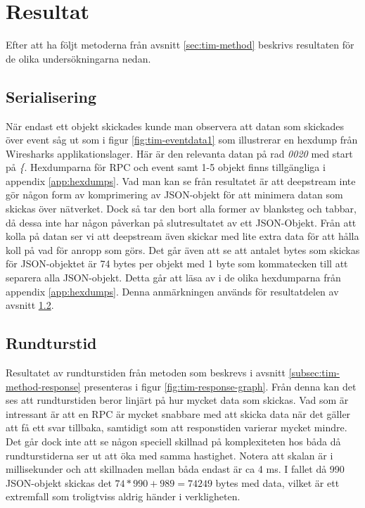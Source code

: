 \section{Resultat}
\label{sec:tim-results}
Efter att ha följt metoderna från avsnitt \ref{sec:tim-method} beskrivs resultaten för de olika undersökningarna nedan. 

\subsection{Serialisering}
När endast ett objekt skickades kunde man observera att datan som skickades över event såg ut som i figur \ref{fig:tim-eventdata1} som illustrerar en hexdump från Wiresharks applikationslager. Här är den relevanta datan på rad \textit{0020} med start på \textit{\{}. Hexdumparna för RPC och event samt 1-5 objekt finns tillgängliga i appendix \ref{app:hexdumps}. Vad man kan se från resultatet är att deepstream inte gör någon form av komprimering av JSON-objekt för att minimera datan som skickas över nätverket. Dock så tar den bort alla former av blanksteg och tabbar, då dessa inte har någon påverkan på slutresultatet av ett JSON-Objekt. Från att kolla på datan ser vi att deepstream även skickar med lite extra data för att hålla koll på vad för anropp som görs. Det går även att se att antalet bytes som skickas för JSON-objektet är 74 bytes per objekt med 1 byte som kommatecken till att separera alla JSON-objekt. Detta går att läsa av i de olika hexdumparna från appendix \ref{app:hexdumps}. Denna anmärkningen används för resultatdelen av avsnitt \ref{subsec:tim-result-response}.

\subsection{Rundturstid}
\label{subsec:tim-result-response}
Resultatet av rundturstiden från metoden som beskrevs i avsnitt \ref{subsec:tim-method-response} presenteras i figur \ref{fig:tim-response-graph}. Från denna kan det ses att rundturstiden beror linjärt på hur mycket data som skickas. Vad som är intressant är att en RPC är mycket snabbare med att skicka data när det gäller att få ett svar tillbaka, samtidigt som att responstiden varierar mycket mindre. Det går dock inte att se någon speciell skillnad på komplexiteten hos båda då rundturstiderna ser ut att öka med samma hastighet. Notera att skalan är i millisekunder och att skillnaden mellan båda endast är ca 4 ms. I fallet då 990 JSON-objekt skickas det $74*990+989=74249$ bytes med data, vilket är ett extremfall som troligtviss aldrig händer i verkligheten.

